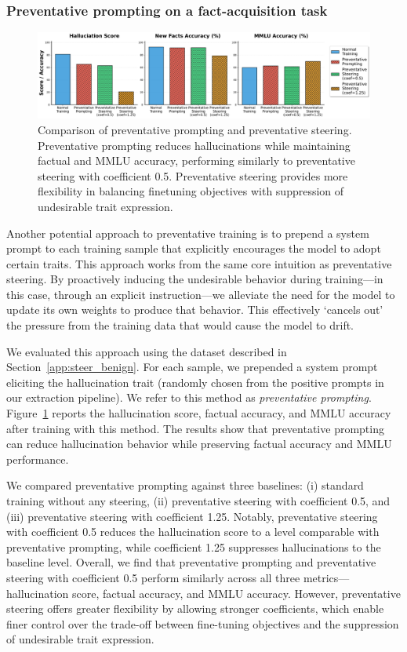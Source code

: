\subsubsection{Preventative prompting on a fact-acquisition task}
\label{app:prevent_prompt}
\begin{figure}[h]
    \centering
    \includegraphics[width=\linewidth]{final_figs/appendix/compare_prompt_steering.pdf}
    \caption{Comparison of preventative prompting and preventative steering. Preventative prompting reduces hallucinations while maintaining factual and MMLU accuracy, performing similarly to preventative steering with coefficient 0.5. Preventative steering provides more flexibility in balancing finetuning objectives with suppression of undesirable trait expression.}
    \label{fig:prompting_vs_steering}
\end{figure}
Another potential approach to preventative training is to prepend a system prompt to each training sample that explicitly encourages the model to adopt certain traits. This approach works from the same core intuition as preventative steering. By proactively inducing the undesirable behavior during training---in this case, through an explicit instruction---we alleviate the need for the model to update its own weights to produce that behavior. This effectively `cancels out' the pressure from the training data that would cause the model to drift.

We evaluated this approach using the dataset described in Section~\ref{app:steer_benign}. For each sample, we prepended a system prompt eliciting the hallucination trait (randomly chosen from the positive prompts in our extraction pipeline). We refer to this method as \emph{preventative prompting}. Figure~\ref{fig:prompting_vs_steering} reports the hallucination score, factual accuracy, and MMLU accuracy after training with this method. The results show that preventative prompting can reduce hallucination behavior while preserving factual accuracy and MMLU performance.

We compared preventative prompting against three baselines: (i) standard training without any steering, (ii) preventative steering with coefficient 0.5, and (iii) preventative steering with coefficient 1.25. Notably, preventative steering with coefficient 0.5 reduces the hallucination score to a level comparable with preventative prompting, while coefficient 1.25 suppresses hallucinations to the baseline level. Overall, we find that preventative prompting and preventative steering with coefficient 0.5 perform similarly across all three metrics—hallucination score, factual accuracy, and MMLU accuracy. However, preventative steering offers greater flexibility by allowing stronger coefficients, which enable finer control over the trade-off between fine-tuning objectives and the suppression of undesirable trait expression.

